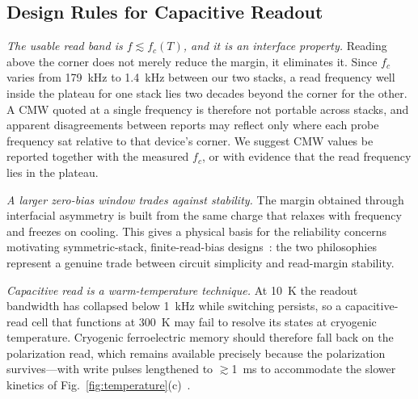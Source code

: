 \documentclass[journal]{IEEEtran}
\newcommand{\fc}{f_{c}}
\begin{document}
\subsection{Design Rules for Capacitive Readout}
\textit{The usable read band is $f \lesssim \fc(T)$, and it is an interface
property.} Reading above the corner does not merely reduce the margin, it
eliminates it. Since $\fc$ varies from 179~kHz to 1.4~kHz between our two
stacks, a read frequency well inside the plateau for one stack lies two
decades beyond the corner for the other. A CMW quoted at a single frequency
is therefore not portable across stacks, and apparent disagreements between
reports may reflect only where each probe frequency sat relative to that
device's corner. We suggest CMW values be reported together with the measured
$\fc$, or with evidence that the read frequency lies in the plateau.

\textit{A larger zero-bias window trades against stability.} The margin
obtained through interfacial asymmetry is built from the same charge that
relaxes with frequency and freezes on cooling. This gives a physical basis
for the reliability concerns motivating symmetric-stack, finite-read-bias
designs~\cite{lee2025aem,rana2025cp,fehlings2025}: the two philosophies
represent a genuine trade between circuit simplicity and read-margin
stability.

\textit{Capacitive read is a warm-temperature technique.} At 10~K the readout
bandwidth has collapsed below 1~kHz while switching persists, so a
capacitive-read cell that functions at 300~K may fail to resolve its states
at cryogenic temperature. Cryogenic ferroelectric memory should therefore
fall back on the polarization read, which remains available precisely because
the polarization survives---with write pulses lengthened to $\gtrsim$1~ms to
accommodate the slower kinetics of
Fig.~\ref{fig:temperature}(c)~\cite{das2026cryo}.

\end{document}
